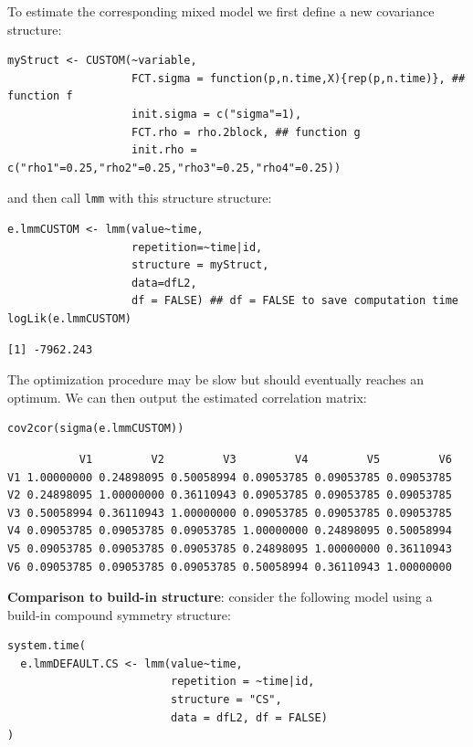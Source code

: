 \documentclass[12pt]{article}
\begin{document}
To estimate the corresponding mixed model we first define a new
covariance structure:
\lstset{language=r,label= ,caption= ,captionpos=b,numbers=none}
\begin{lstlisting}
myStruct <- CUSTOM(~variable,
                   FCT.sigma = function(p,n.time,X){rep(p,n.time)}, ## function f
                   init.sigma = c("sigma"=1),
                   FCT.rho = rho.2block, ## function g
                   init.rho = c("rho1"=0.25,"rho2"=0.25,"rho3"=0.25,"rho4"=0.25))
\end{lstlisting}

and then call \texttt{lmm} with this structure structure:
\lstset{language=r,label= ,caption= ,captionpos=b,numbers=none}
\begin{lstlisting}
e.lmmCUSTOM <- lmm(value~time,
                   repetition=~time|id,
                   structure = myStruct,
                   data=dfL2,
                   df = FALSE) ## df = FALSE to save computation time
logLik(e.lmmCUSTOM)
\end{lstlisting}

\begin{verbatim}
[1] -7962.243
\end{verbatim}


The optimization procedure may be slow but should eventually reaches
an optimum. We can then output the estimated correlation matrix:
\lstset{language=r,label= ,caption= ,captionpos=b,numbers=none}
\begin{lstlisting}
cov2cor(sigma(e.lmmCUSTOM))
\end{lstlisting}

\begin{verbatim}
           V1         V2         V3         V4         V5         V6
V1 1.00000000 0.24898095 0.50058994 0.09053785 0.09053785 0.09053785
V2 0.24898095 1.00000000 0.36110943 0.09053785 0.09053785 0.09053785
V3 0.50058994 0.36110943 1.00000000 0.09053785 0.09053785 0.09053785
V4 0.09053785 0.09053785 0.09053785 1.00000000 0.24898095 0.50058994
V5 0.09053785 0.09053785 0.09053785 0.24898095 1.00000000 0.36110943
V6 0.09053785 0.09053785 0.09053785 0.50058994 0.36110943 1.00000000
\end{verbatim}


\clearpage

\textbf{Comparison to build-in structure}: consider the following model using
a build-in compound symmetry structure:
\lstset{language=r,label= ,caption= ,captionpos=b,numbers=none}
\begin{lstlisting}
system.time(
  e.lmmDEFAULT.CS <- lmm(value~time,
                         repetition = ~time|id,
                         structure = "CS", 
                         data = dfL2, df = FALSE)
)
\end{lstlisting}
\end{document}
